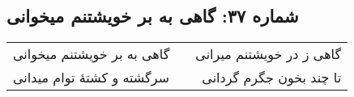 \begin{center}
\section*{شماره ۳۷: گاهی به بر خویشتنم میخوانی}
\label{sec:037}
\begin{longtable}{l p{0.5cm} r}
گاهی به بر خویشتنم میخوانی
&&
گاهی ز در خویشتنم میرانی
\\
سرگشته و کشتهٔ توام میدانی
&&
تا چند بخون جگرم گردانی
\\
\end{longtable}
\end{center}
